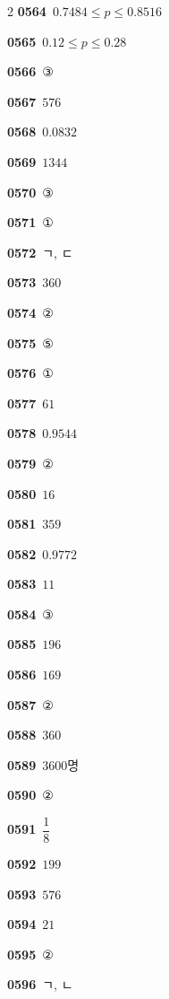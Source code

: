 \documentclass[10pt,a4paper]{article}
\begin{document}
\begin{multicols}{2}
\noindent\textbf{0564}\ $0.7484\le p\le 0.8516$\par
\noindent\textbf{0565}\ $0.12\le p\le 0.28$\par
\noindent\textbf{0566}\ ③\par
\noindent\textbf{0567}\ $576$\par
\noindent\textbf{0568}\ $0.0832$\par
\noindent\textbf{0569}\ $1344$\par
\noindent\textbf{0570}\ ③\par
\noindent\textbf{0571}\ ①\par
\noindent\textbf{0572}\ ㄱ, ㄷ\par
\noindent\textbf{0573}\ $360$\par
\noindent\textbf{0574}\ ②\par
\noindent\textbf{0575}\ ⑤\par
\noindent\textbf{0576}\ ①\par
\noindent\textbf{0577}\ $61$\par
\noindent\textbf{0578}\ $0.9544$\par
\noindent\textbf{0579}\ ②\par
\noindent\textbf{0580}\ $16$\par
\noindent\textbf{0581}\ $359$\par
\noindent\textbf{0582}\ $0.9772$\par
\noindent\textbf{0583}\ $11$\par
\noindent\textbf{0584}\ ③\par
\noindent\textbf{0585}\ $196$\par
\noindent\textbf{0586}\ $169$\par
\noindent\textbf{0587}\ ②\par
\noindent\textbf{0588}\ $360$\par
\noindent\textbf{0589}\ $3600$명\par
\noindent\textbf{0590}\ ②\par
\noindent\textbf{0591}\ $\dfrac{1}{8}$\par
\noindent\textbf{0592}\ $199$\par
\noindent\textbf{0593}\ $576$\par
\noindent\textbf{0594}\ $21$\par
\noindent\textbf{0595}\ ②\par
\noindent\textbf{0596}\ ㄱ, ㄴ\par
\end{multicols}
\end{document}
